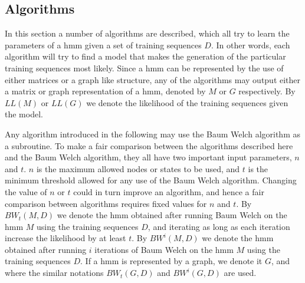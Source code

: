 \subsection{Algorithms}
In this section a number of algorithms are described, which all try to learn the parameters of a \gls{hmm} given a set of training sequences $D$.
In other words, each algorithm will try to find a model that makes the generation of the particular training sequences most likely.
Since a \gls{hmm} can be represented by the use of either matrices or a graph like structure, any of the algorithms may output either a matrix or graph representation of a \gls{hmm}, denoted by $M$ or $G$ respectively.
By $LL(M)$ or $LL(G)$ we denote the likelihood of the training sequences given the model.

Any algorithm introduced in the following may use the Baum Welch algorithm as a subroutine. 
To make a fair comparison between the algorithms described here and the Baum Welch algorithm, they all have two important input parameters, $n$ and $t$.
$n$ is the maximum allowed nodes or states to be used, and $t$ is the minimum threshold allowed for any use of the Baum Welch algorithm.
Changing the value of $n$ or $t$ could in turn improve an algorithm, and hence a fair comparison between algorithms requires fixed values for $n$ and $t$.
By $BW_t(M, D)$ we denote the \gls{hmm} obtained after running Baum Welch on the \gls{hmm} $M$ using the training sequences $D$, and iterating as long as each iteration increase the likelihood by at least $t$.
By $BW^i(M, D)$ we denote the \gls{hmm} obtained after running $i$ iterations of Baum Welch on the \gls{hmm} $M$ using the training sequences $D$.
If a \gls{hmm} is represented by a graph, we denote it $G$, and where the similar notations $BW_t(G, D)$ and $BW^i(G, D)$ are used.


